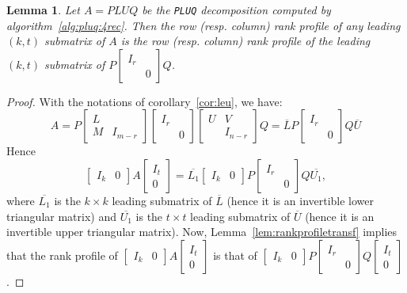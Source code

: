 \documentclass{article}
\newcommand{\pluq}{\texttt{PLUQ}\xspace}
\newtheorem{lemma}{Lemma}
\begin{document}
\begin{lemma}
  Let $A=PLUQ$ be the \pluq decomposition computed by algorithm~\ref{alg:pluq:4rec}.
  Then the row (resp. column) rank profile of any leading $(k,t)$ submatrix of
  $A$ is the row (resp. column) rank profile of the leading $(k,t)$ submatrix
  of $P
  \begin{bmatrix}
    I_r\\&0
  \end{bmatrix}Q
  $.
\end{lemma}
\begin{proof}With the notations of corollary~\ref{cor:leu}, we have:
  \begin{equation*}
    A= P 
  \begin{bmatrix}
    L\\M&I_{m-r}
  \end{bmatrix}
  \begin{bmatrix}
    I_r\\&0
  \end{bmatrix}
  \begin{bmatrix}
    U&V\\&I_{n-r}
  \end{bmatrix}
Q
= \overline{L} P
\begin{bmatrix}
  I_r\\&0
\end{bmatrix}
Q\overline{U}
 \end{equation*}
Hence $$
    \begin{bmatrix}
      I_k&0
    \end{bmatrix}
    A
    \begin{bmatrix}
      I_t\\0
    \end{bmatrix}
= \overline{L_1}    
\begin{bmatrix}
  I_k&0
\end{bmatrix}
P
\begin{bmatrix}
  I_r\\&0
\end{bmatrix}
Q\overline{U_1},
$$
where $\overline{L_1}$ is the $k\times k$ leading submatrix of $\overline{L}$
(hence it is an invertible lower triangular matrix) and $\overline{U_1}$ is the
  $t\times t$ leading submatrix of $\overline{U}$ (hence it is an invertible
  upper triangular matrix). 
Now, Lemma~\ref{lem:rankprofiletransf} implies  that the rank profile of 
$
\begin{bmatrix}
  I_k&0
\end{bmatrix}A
\begin{bmatrix}
  I_t\\0
\end{bmatrix}$
is that of 
$
\begin{bmatrix}
  I_k&0
\end{bmatrix}
P
\begin{bmatrix}
  I_r\\&0
\end{bmatrix}
Q
\begin{bmatrix}
  I_t\\0
\end{bmatrix}$.
\end{proof}
\end{document}
